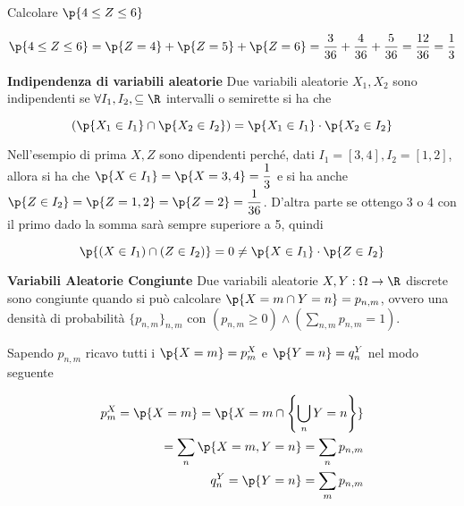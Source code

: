 \begin{exmp}
    Calcolare $ \p{4 \leq Z \leq 6} $
    
    \begin{equation*}
    \p{4 \leq Z \leq 6} = \p{Z = 4} + \p{Z = 5} + \p{Z = 6} = \dfrac{3}{36} + \dfrac{4}{36} + \dfrac{5}{36} = \dfrac{12}{36} = \dfrac{1}{3}
    \end{equation*}
\end{exmp}		


\begin{defn}
    \textbf{Indipendenza di variabili aleatorie}
    Due variabili aleatorie $ X_1, X_2 $ sono indipendenti se $ \forall I_1,
    I_2, \subseteq \R $ intervalli o semirette si ha che 
    
    \begin{equation*}
        \left( \p{X_1 \in I_1} \cap \p{X_2 \in I_2} \right) = \p{X_1 \in I_1} \cdot \p{X_2 \in I_2}
    \end{equation*}
\end{defn}
    
    Nell'esempio di prima $ X, Z $  sono dipendenti perch\'e, dati $ I_1 =
    [3,4], I_2 = [1,2] $, allora si ha che $ \p{X\in I_1} = \p{X=3,4} =
    \dfrac{1}{3} $ e si ha anche $ \p{Z \in I_2} = \p{Z=1,2} = \p{Z=2} =
    \dfrac{1}{36} $. D'altra parte se ottengo 3 o 4 con il primo dado la somma
    sar\`a sempre superiore a 5, quindi

    \begin{equation*}
    \p{(X \in I_1) \cap (Z\in I_2)} =0\neq  \p{X \in I_1} \cdot \p{Z \in I_2}
    \end{equation*}



\begin{defn}
    \textbf{Variabili Aleatorie Congiunte}
    Due variabili aleatorie $ X,Y : \Omega \to \R $ discrete sono congiunte
    quando si pu\`o  calcolare $ \p{X = m \cap Y = n} = p_{n,m} $, ovvero una
    densit\`a  di probabilit\`a  $ \{ p_{n,m} \}_{n,m} $ con $ (p_{n,m} \geq 0 )
    \land (\sum_{n,m} p_{n,m} = 1) $.
\end{defn}

Sapendo $ p_{n,m} $ ricavo tutti i $ \p{X=m} = p^X_m $ e $ \p{Y = n} = q^Y_n $
nel modo seguente

\begin{equation*}
    \begin{aligned}
    p^X_m =\p{X=m} = \p{X = m \cap \left\{ \bigcup_{n} Y=n \right\}} \\
    = \sum_{n} \p{X=m,Y=n} = \sum_n p_{n,m}\\
    q^Y_n=\p{Y=n} = \sum_{m} p_{n,m}
    \end{aligned}
\end{equation*}
    
